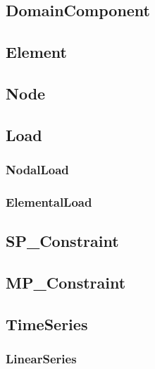 
\subsection{{\bf DomainComponent}}


\pagebreak
\subsection{{\bf Element}}


\pagebreak
\subsection{Node}


\pagebreak
\subsection{{\bf Load}}


\pagebreak
\subsubsection{NodalLoad}


\pagebreak
\subsubsection{\bf ElementalLoad}


\pagebreak
\subsection{SP\_Constraint}


\pagebreak
\subsection{MP\_Constraint}


\pagebreak
\subsection {\bf TimeSeries}


\pagebreak
\subsubsection {LinearSeries}


